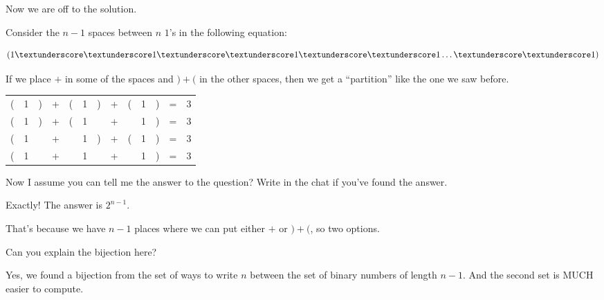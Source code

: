 \documentclass[compress]{beamer}
\begin{document}
\begin{frame}
    Now we are off to the solution.
    \pause\vspace{1em}

    Consider the $n-1$ spaces between $n$ $1$'s in the following equation:

    \textcolor{NordRed}{
        \[\left(1 \textunderscore\textunderscore 1
                \textunderscore\textunderscore 1 \textunderscore\textunderscore 1
        \dots \textunderscore\textunderscore 1\right) \]
    }

    \pause\vspace{1em}

    If we place \textcolor{NordRed}{$+$} in some of the spaces and
    \textcolor{NordRed}{$) + ($} in the other spaces, then we get a
    ``partition'' like the one we saw before.

    \pause\vspace{1em}
    
    \begin{center}
        \begin{tabular}{ccccccccccccc}
            ( & 1 & )& +  & ( & 1 & ) &+& ( & 1 & ) & = & 3\\
            ( & 1 & ) &+& ( & 1 & & +& & 1 & ) & = & 3\\
            ( & 1 &  & +& & 1 & ) &+ & ( & 1 & ) & = & 3\\
            ( & 1 &  & +& & 1 &  & +& & 1 & ) & = & 3\\
        \end{tabular}
    \end{center}

\end{frame}

\begin{frame}
    Now I assume you can tell me the answer to the question? Write in the chat
    if you've found the answer.

    \pause\vspace{1em}

    \textcolor{NordBrightBlue}{Exactly! The answer is $2^{n-1}$. } 

    \pause\vspace{1em}

    That's because we have $n-1$ places where we can put either $+$ or $)+($,
    so two options.
\end{frame}


\begin{frame}
    Can you explain the bijection here? 

    \pause\vspace{1em}

    Yes, \textcolor{NordBrightBlue}{we found a bijection from the set of ways
    to write $n$ between the set of binary numbers of length $n-1$.} And the
    second set is MUCH easier to compute.
\end{frame}
\end{document}
